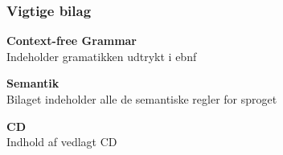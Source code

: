 \subsubsection*{Vigtige bilag}
\begin{itemize_small}
    \item \textbf{Context-free Grammar}\\
    Indeholder gramatikken udtrykt i \gls{ebnf}\\
    \item \textbf{Semantik}\\
    Bilaget indeholder alle de semantiske regler for sproget\\
    \item \textbf{CD}\\
    Indhold af vedlagt CD\\
\end{itemize_small}

